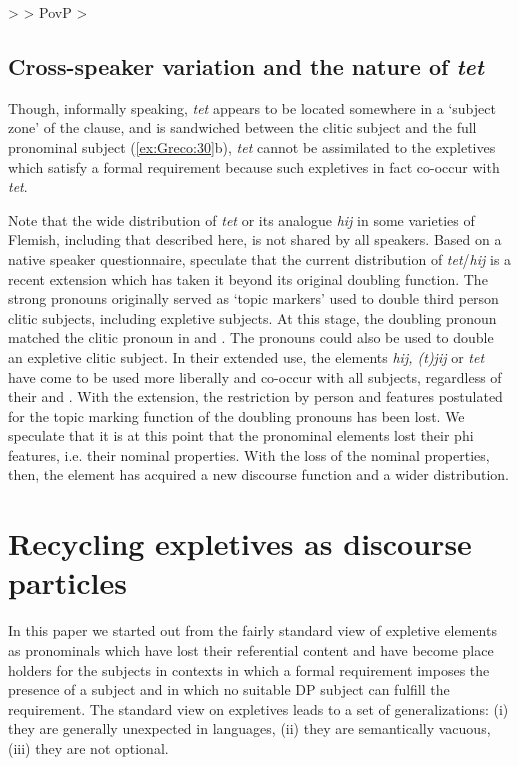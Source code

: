 \documentclass[output=paper]{LSP/langsci}
\begin{document}
\ea \label{ex:Greco:37b}  >  > PovP >  \z
\subsection{Cross-speaker variation and the nature of \textit{tet}} \label{sec:Greco:5.4.}
Though, informally speaking, \textit{tet} appears to be located somewhere in a ‘subject zone’ of the clause, and is sandwiched between the clitic subject and the full pronominal subject (\ref{ex:Greco:30}b), \textit{tet} cannot be assimilated to the expletives which satisfy a formal requirement because such expletives in fact co-occur with \textit{tet}.

Note that the wide distribution of \textit{tet} or its analogue \textit{hij} in some varieties of Flemish, including that described here, is not shared by all speakers. Based on a native speaker questionnaire, \citet[272, 278]{DeVogelaerEtAl2008} speculate that the current distribution of \textit{tet}/\textit{hij} is a recent extension which has taken it beyond its original doubling function. The strong pronouns originally served as ‘topic markers’ used to double third person clitic subjects, including expletive subjects. At this stage, the doubling pronoun matched the clitic pronoun in  and . The pronouns could also be used to double an expletive clitic subject. In their extended use, the elements \textit{hij, (t)jij} or \textit{tet} have come to be used more liberally and co-occur with all subjects, regardless of their  and . With the extension, the restriction by person and  features postulated for the topic marking function of the doubling pronouns has been lost. We speculate that it is at this point that the pronominal elements lost their phi features, i.e. their nominal properties. With the loss of the nominal properties, then, the element has acquired a new discourse function and a wider distribution.

\section{Recycling expletives as discourse particles}\label{sec:Greco:6}
In this paper we started out from the fairly standard view of expletive elements as pronominals which have lost their referential content and have become place holders for the subjects in contexts in which a formal requirement imposes the presence of a subject and in which no suitable DP subject can fulfill the requirement. The standard view on expletives leads to a set of generalizations: (i) they are generally unexpected in  languages, (ii) they are semantically vacuous, (iii) they are not optional.
\end{document}
